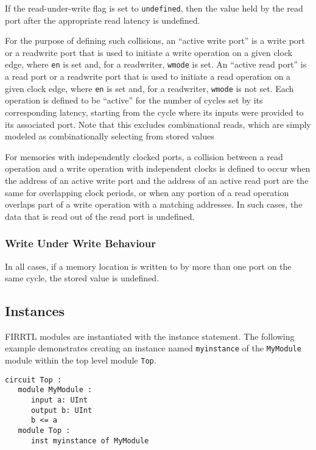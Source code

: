 \documentclass[12pt]{article}
\begin{document}
If the read-under-write flag is set to \verb|undefined|, then the value held by the read port after the appropriate read latency is undefined.


For the purpose of defining such collisions, an ``active write port'' is a write port or a readwrite port that is used to initiate a write operation on a given clock edge, where \verb|en| is set and, for a readwriter, \verb|wmode| is set.
An ``active read port'' is a read port or a readwrite port that is used to initiate a read operation on a given clock edge, where \verb|en| is set and, for a readwriter, \verb|wmode| is not set.
Each operation is defined to be ``active'' for the number of cycles set by its corresponding latency, starting from the cycle where its inputs were provided to its associated port.
Note that this excludes combinational reads, which are simply modeled as combinationally selecting from stored values

For memories with independently clocked ports, a collision between a read operation and a write operation with independent clocks is defined to occur when the address of an active write port and the address of an active read port are the same for overlapping clock periods, or when any portion of a read operation overlaps part of a write operation with a matching addresses.
In such cases, the data that is read out of the read port is undefined.

\subsubsection{Write Under Write Behaviour}

In all cases, if a memory location is written to by more than one port on the same cycle, the stored value is undefined.

\subsection{Instances}\label{instances}
FIRRTL modules are instantiated with the instance statement. The following example demonstrates creating an instance named \verb|myinstance| of the \verb|MyModule| module within the top level module \verb|Top|.

\begin{lstlisting}
circuit Top :
   module MyModule :
      input a: UInt
      output b: UInt
      b <= a
   module Top :
      inst myinstance of MyModule
\end{lstlisting}
\end{document}
